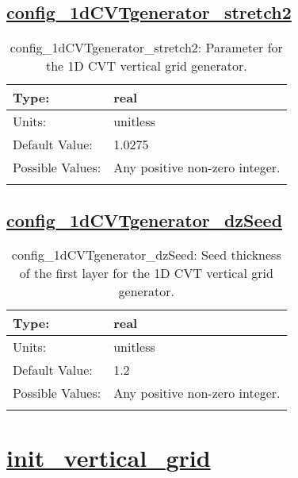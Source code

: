 \subsection[config\_1dCVTgenerator\_stretch2]{\hyperref[sec:nm_tab_CVTgenerator]{config\_1dCVTgenerator\_stretch2}}
\label{subsec:nm_sec_config_1dCVTgenerator_stretch2}
\begin{center}
\begin{longtable}{| p{2.0in} || p{4.0in} |}
    \hline
    Type: & real \\
    \hline
    Units: & \si{unitless} \\
    \hline
    Default Value: & 1.0275 \\
    \hline
    Possible Values: & Any positive non-zero integer. \\
    \hline
    \caption{config\_1dCVTgenerator\_stretch2: Parameter for the 1D CVT vertical grid generator.}
\end{longtable}
\end{center}
\subsection[config\_1dCVTgenerator\_dzSeed]{\hyperref[sec:nm_tab_CVTgenerator]{config\_1dCVTgenerator\_dzSeed}}
\label{subsec:nm_sec_config_1dCVTgenerator_dzSeed}
\begin{center}
\begin{longtable}{| p{2.0in} || p{4.0in} |}
    \hline
    Type: & real \\
    \hline
    Units: & \si{unitless} \\
    \hline
    Default Value: & 1.2 \\
    \hline
    Possible Values: & Any positive non-zero integer. \\
    \hline
    \caption{config\_1dCVTgenerator\_dzSeed: Seed thickness of the first layer for the 1D CVT vertical grid generator.}
\end{longtable}
\end{center}
\section[init\_vertical\_grid]{\hyperref[sec:nm_tab_init_vertical_grid]{init\_vertical\_grid}}
\label{sec:nm_sec_init_vertical_grid}
